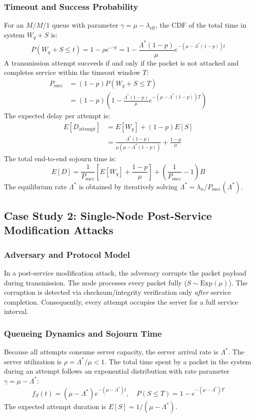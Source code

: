 \documentclass[journal,compsoc]{IEEEtran}
\begin{document}
\subsubsection{Timeout and Success Probability}
For an $M/M/1$ queue with parameter $\gamma = \mu - \lambda_{\text{eff}}$, the CDF of the total time in system $W_q + S$ is:
\begin{equation}
P(W_q + S \le t) = 1 - \rho e^{-\gamma t} = 1 - \frac{\Lambda^*(1-p)}{\mu} e^{-(\mu - \Lambda^*(1-p))t}
\end{equation}
A transmission attempt succeeds if and only if the packet is not attacked and completes service within the timeout window $T$:
\begin{align}
P_{\text{succ}} &= (1 - p) P(W_q + S \le T) \nonumber \\
&= (1 - p)\left(1 - \frac{\Lambda^*(1-p)}{\mu} e^{-(\mu - \Lambda^*(1-p))T}\right)
\end{align}
The expected delay per attempt is:
\begin{align}
E[D_{\text{attempt}}] &= E[W_q] + (1 - p) E[S] \nonumber \\
&= \frac{\Lambda^*(1-p)}{\mu(\mu - \Lambda^*(1-p))} + \frac{1-p}{\mu}
\end{align}
The total end-to-end sojourn time is:
\begin{equation}
E[D] = \frac{1}{P_{\text{succ}}} \left[E[W_q] + \frac{1-p}{\mu}\right] + \left(\frac{1}{P_{\text{succ}}} - 1\right) B
\end{equation}
The equilibrium rate $\Lambda^*$ is obtained by iteratively solving $\Lambda^* = \lambda_n / P_{\text{succ}}(\Lambda^*)$.

\subsection{Case Study 2: Single-Node Post-Service Modification Attacks}
\subsubsection{Adversary and Protocol Model}
In a post-service modification attack, the adversary corrupts the packet payload during transmission. The node processes every packet fully ($S \sim \text{Exp}(\mu)$). The corruption is detected via checksum/integrity verification only \textit{after} service completion. Consequently, every attempt occupies the server for a full service interval.

\subsubsection{Queueing Dynamics and Sojourn Time}
Because all attempts consume server capacity, the server arrival rate is $\Lambda^*$. The server utilization is $\rho = \Lambda^*/\mu < 1$. The total time spent by a packet in the system during an attempt follows an exponential distribution with rate parameter $\gamma = \mu - \Lambda^*$:
\begin{equation}
f_S(t) = (\mu - \Lambda^*) e^{-(\mu - \Lambda^*) t}, \quad P(S \le T) = 1 - e^{-(\mu - \Lambda^*) T}
\end{equation}
The expected attempt duration is $E[S] = 1/(\mu - \Lambda^*)$.
\end{document}
